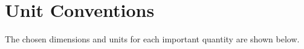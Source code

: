 \documentclass{article}
\begin{document}




































\newpage
% 



























\newpage
\appendix
{}

\section{Unit Conventions}\label{app:unitConventions}

The chosen dimensions and units for each important quantity are shown below.
\end{document}
